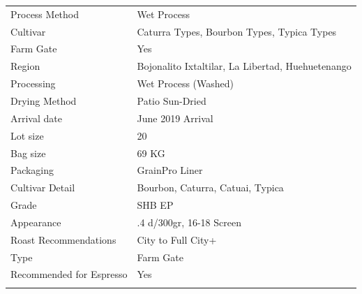 \documentclass[10pt,twoside,footinclude=true,headinclude=true]{scrbook} %
\newlength{\mysize}
\newcommand{\myfontsize}[1]{
  \setlength{\mysize}{#1pt}
  \fontsize{\mysize}{1.2\mysize}
  \selectfont
}
\begin{document}
\vspace{1em}
\begin{table}[htbp]
\myfontsize{7}
\hspace*{2.2em}
\begin{tabular}{ >{\raggedleft\arraybackslash}p{3.6cm}!{\color{lightgray}\vrule}p{7cm} }
\hline
  Process Method & Wet Process \\
  \hline
  Cultivar & Caturra Types, Bourbon Types, Typica Types \\
  \hline
  Farm Gate & Yes \\
  \hline
  Region & Bojonalito Ixtaltilar, La Libertad, Huehuetenango \\
  \hline
  Processing & Wet Process (Washed) \\
  \hline
  Drying Method & Patio Sun-Dried \\
  \hline
  Arrival date & June 2019 Arrival \\
  \hline
  Lot size & 20 \\
  \hline
  Bag size & 69 KG \\
  \hline
  Packaging & GrainPro Liner \\
  \hline
  Cultivar Detail & Bourbon, Caturra, Catuai, Typica \\
  \hline
  Grade & SHB EP \\
  \hline
  Appearance & .4 d/300gr, 16-18 Screen \\
  \hline
  Roast Recommendations & City to Full City+ \\
  \hline
  Type & Farm Gate \\
  \hline
  Recommended for Espresso & Yes \\
  \hline

\end{tabular}
\end{table}

\end{document}
